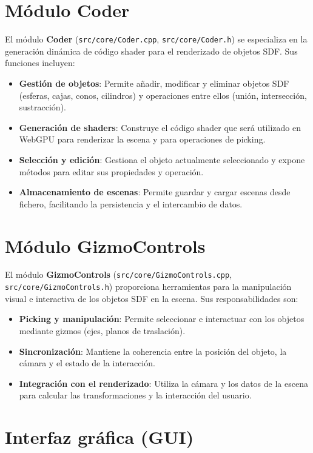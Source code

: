 \section{Módulo Coder}

El módulo \textbf{Coder} (\texttt{src/core/Coder.cpp},
\texttt{src/core/Coder.h}) se especializa en la generación dinámica de código
shader para el renderizado de objetos SDF. Sus funciones incluyen:
\begin{itemize}
    \item \textbf{Gestión de objetos}: Permite añadir, modificar y eliminar objetos SDF (esferas, cajas, conos, cilindros) y operaciones entre ellos (unión, intersección, sustracción).
    \item \textbf{Generación de shaders}: Construye el código shader que será utilizado en WebGPU para renderizar la escena y para operaciones de picking.
    \item \textbf{Selección y edición}: Gestiona el objeto actualmente seleccionado y expone métodos para editar sus propiedades y operación.
    \item \textbf{Almacenamiento de escenas}: Permite guardar y cargar escenas desde fichero, facilitando la persistencia y el intercambio de datos.
\end{itemize}

\section{Módulo GizmoControls}

El módulo \textbf{GizmoControls} (\texttt{src/core/GizmoControls.cpp},
\texttt{src/core/GizmoControls.h}) proporciona herramientas para la
manipulación visual e interactiva de los objetos SDF en la escena. Sus
responsabilidades son:
\begin{itemize}
    \item \textbf{Picking y manipulación}: Permite seleccionar e interactuar con los objetos mediante gizmos (ejes, planos de traslación).
    \item \textbf{Sincronización}: Mantiene la coherencia entre la posición del objeto, la cámara y el estado de la interacción.
    \item \textbf{Integración con el renderizado}: Utiliza la cámara y los datos de la escena para calcular las transformaciones y la interacción del usuario.
\end{itemize}

\section{Interfaz gráfica (GUI)}

